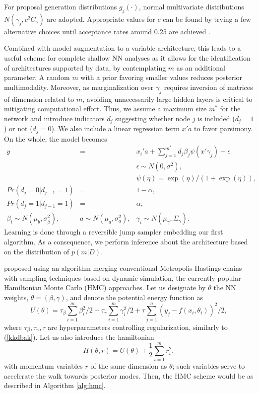\noindent For proposal generation distributions $g_j(\cdot)$,
normal multivariate distributions
$N(\gamma_j,c^2 C_\gamma)$ are 
adopted. %
Appropriate values for $c$ can be found by trying
a few alternative choices until acceptance rates around
 0.25 are achieved \parencite{gamerman}. 

Combined with model augmentation to a variable architecture,
 this leads to a useful scheme
for complete shallow NN analyses as it allows for 
the identification of
architectures supported by data, by  
contemplating $m$ as an additional parameter.
A random $m$ with a prior 
favoring smaller values reduces posterior multimodality.
Moreover, as marginalization over $\gamma_ j$ requires inversion of matrices
of dimension related to $m$, 
avoiding unnecessarily large
hidden layers is critical to
mitigating computational effort.
 Thus, we assume 
a maximum size $m^*$ for the network and introduce 
indicators  $d_j$ suggesting whether node
$j$ is included ($d_j=1$) or not ($d_j=0$). 
We  also 
include a linear regression term $x'a$
to favor parsimony. On the whole, the model
becomes 
\begin{eqnarray*}
  y          & = & x_i'a + \sum_{j=1}^{m^*} d_j\beta_j \psi(x '\gamma_j) +
                    \epsilon \\ %
                    & & \epsilon \sim N(0,\sigma^2),\nonumber \\
                    & &    \psi(\eta) = \exp(\eta)/(1+\exp(\eta)),
                        \nonumber \\
  Pr(d_j=0|d_{j-1}=1)   & = & 1-\alpha, \nonumber\\
  Pr(d_j=1|d_{j-1}=1)   & = & \alpha, \nonumber\\
  \beta_i    \sim  N(\mu_b,\sigma_\beta^2),& 
  a     \sim  N(\mu_a,\sigma_a^2), &   \gamma_i   \sim  N(\mu_\gamma,\Sigma_\gamma).
                \label{eq:model-var}
\end{eqnarray*}
Learning is done through a reversible jump sampler
\parencite{green} embedding our first algorithm.
As a consequence, we perform inference
about the architecture based on the distribution of 
 $p(m|D)$. 

 \textcite{neal2012bayesian} proposed using an 
algorithm merging conventional Metropolis-Hastings chains with sampling
techniques based on dynamic simulation, the currently popular
Hamiltonian Monte Carlo (HMC) approaches.
Let us designate by $\theta$ the NN 
weights, $\theta = (\beta, \gamma)$, and denote the potential energy function as
$$
U(\theta) = \tau_{\beta}\sum_{i=1}^m \beta_i^2/2 + \tau_{\gamma} \sum_{i=1}^m \gamma_i^2/2 + \tau \sum_{j=1}^n (y_j - f(x_i, \theta_i))^2/2,
$$
where $\tau_{\beta}, \tau_{\gamma}, \tau$ are hyperparameters 
controlling regularization, similarly to (\ref{kkdbak}). 
Let us also introduce the hamiltonian 
$$
H(\theta, r) = U(\theta) + \frac{1}{2} \sum_{i=1}^m r_i^2,
$$
with momentum variables $r$ of the same dimension as $\theta$; such 
 variables serve to accelerate the walk towards posterior modes. Then, the HMC scheme would be as described in Algorithm \ref{alg:hmc}.

